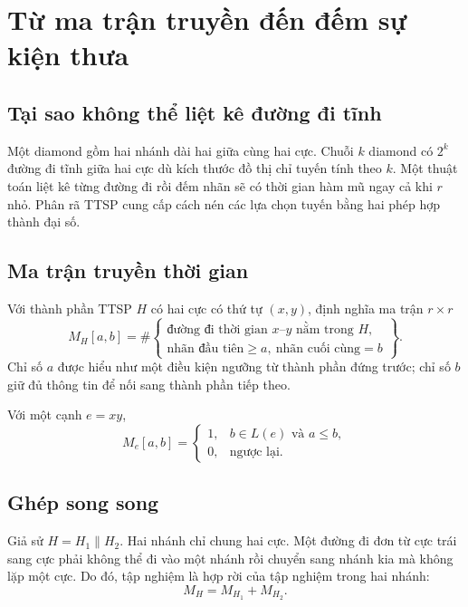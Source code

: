 \chapter{Từ ma trận truyền đến đếm sự kiện thưa}
\label{chap:ttsp}

\section{Tại sao không thể liệt kê đường đi tĩnh}

Một diamond gồm hai nhánh dài hai giữa cùng hai cực. Chuỗi $k$ diamond có $2^k$ đường đi tĩnh giữa hai cực dù kích thước đồ thị chỉ tuyến tính theo $k$. Một thuật toán liệt kê từng đường đi rồi đếm nhãn sẽ có thời gian hàm mũ ngay cả khi $r$ nhỏ. Phân rã TTSP cung cấp cách nén các lựa chọn tuyến bằng hai phép hợp thành đại số.

\section{Ma trận truyền thời gian}

Với thành phần TTSP $H$ có hai cực có thứ tự $(x,y)$, định nghĩa ma trận $r\times r$
\begin{equation}
\label{eq:transfer-definition}
  M_H[a,b]=\#\left\{
  \begin{array}{l}
  \text{đường đi thời gian }x\text{--}y\text{ nằm trong }H,\\
  \text{nhãn đầu tiên}\ge a,\ \text{nhãn cuối cùng}=b
  \end{array}\right\}.
\end{equation}
Chỉ số $a$ được hiểu như một điều kiện ngưỡng từ thành phần đứng trước; chỉ số $b$ giữ đủ thông tin để nối sang thành phần tiếp theo.

Với một cạnh $e=xy$,
\begin{equation}
\label{eq:edge-transfer}
  M_e[a,b]=
  \begin{cases}
  1,& b\in L(e)\text{ và }a\le b,\\
  0,& \text{ngược lại.}
  \end{cases}
\end{equation}

\section{Ghép song song}

Giả sử $H=H_1\parallel H_2$. Hai nhánh chỉ chung hai cực. Một đường đi đơn từ cực trái sang cực phải không thể đi vào một nhánh rồi chuyển sang nhánh kia mà không lặp một cực. Do đó, tập nghiệm là hợp rời của tập nghiệm trong hai nhánh:
\begin{equation}
\label{eq:parallel-transfer}
  M_H=M_{H_1}+M_{H_2}.
\end{equation}

